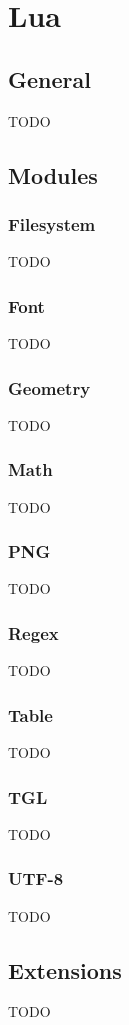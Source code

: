 \section{Lua}
\label{sec:lua}

\subsection{General}
\label{sec:general}

TODO

\subsection{Modules}
\label{sec:modules}

\subsubsection{Filesystem}
\label{sec:filesystem}

TODO

\subsubsection{Font}
\label{sec:font}

TODO

\subsubsection{Geometry}
\label{sec:geometry}

TODO

\subsubsection{Math}
\label{sec:math}

TODO

\subsubsection{PNG}
\label{sec:png}

TODO

\subsubsection{Regex}
\label{sec:regex}

TODO

\subsubsection{Table}
\label{sec:table}

TODO

\subsubsection{TGL}
\label{sec:tgl}

TODO

\subsubsection{UTF-8}
\label{sec:utf8}

TODO

\subsection{Extensions}
\label{sec:extensions}

TODO

